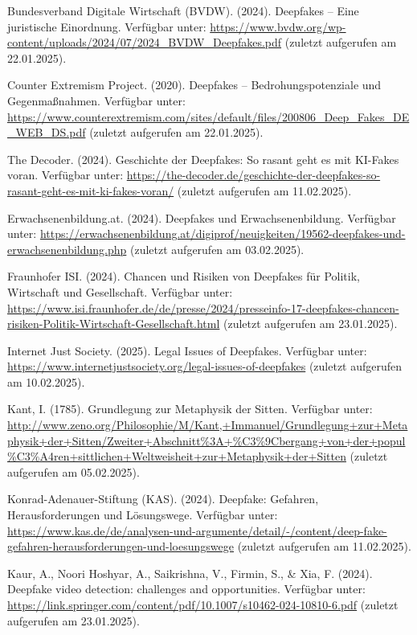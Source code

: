 \documentclass[a4paper,12pt]{article}
\begin{document}
\begin{thebibliography}{99}
 Bundesverband Digitale Wirtschaft (BVDW). (2024). Deepfakes – Eine juristische Einordnung. 
Verfügbar unter: \url{https://www.bvdw.org/wp-content/uploads/2024/07/2024_BVDW_Deepfakes.pdf} (zuletzt aufgerufen am 22.01.2025).

 Counter Extremism Project. (2020). Deepfakes – Bedrohungspotenziale und Gegenmaßnahmen.
Verfügbar unter: \url{https://www.counterextremism.com/sites/default/files/200806_Deep_Fakes_DE_WEB_DS.pdf} (zuletzt aufgerufen am 22.01.2025).

 The Decoder. (2024). Geschichte der Deepfakes: So rasant geht es mit KI-Fakes voran.
Verfügbar unter: \url{https://the-decoder.de/geschichte-der-deepfakes-so-rasant-geht-es-mit-ki-fakes-voran/} (zuletzt aufgerufen am 11.02.2025).

 Erwachsenenbildung.at. (2024). Deepfakes und Erwachsenenbildung. 
Verfügbar unter: \url{https://erwachsenenbildung.at/digiprof/neuigkeiten/19562-deepfakes-und-erwachsenenbildung.php} (zuletzt aufgerufen am 03.02.2025).

 Fraunhofer ISI. (2024). Chancen und Risiken von Deepfakes für Politik, Wirtschaft und Gesellschaft. 
Verfügbar unter: \url{https://www.isi.fraunhofer.de/de/presse/2024/presseinfo-17-deepfakes-chancen-risiken-Politik-Wirtschaft-Gesellschaft.html} (zuletzt aufgerufen am 23.01.2025).

 Internet Just Society. (2025). Legal Issues of Deepfakes.
Verfügbar unter: \url{https://www.internetjustsociety.org/legal-issues-of-deepfakes} (zuletzt aufgerufen am 10.02.2025).

 Kant, I. (1785). Grundlegung zur Metaphysik der Sitten.  
Verfügbar unter: \url{http://www.zeno.org/Philosophie/M/Kant,+Immanuel/Grundlegung+zur+Metaphysik+der+Sitten/Zweiter+Abschnitt%3A+%C3%9Cbergang+von+der+popul%C3%A4ren+sittlichen+Weltweisheit+zur+Metaphysik+der+Sitten} (zuletzt aufgerufen am 05.02.2025).

 Konrad-Adenauer-Stiftung (KAS). (2024). Deepfake: Gefahren, Herausforderungen und Lösungswege.
Verfügbar unter: \url{https://www.kas.de/de/analysen-und-argumente/detail/-/content/deep-fake-gefahren-herausforderungen-und-loesungswege} (zuletzt aufgerufen am 11.02.2025).

 Kaur, A., Noori Hoshyar, A., Saikrishna, V., Firmin, S., \& Xia, F. (2024). Deepfake video detection: challenges and opportunities. 
Verfügbar unter: \url{https://link.springer.com/content/pdf/10.1007/s10462-024-10810-6.pdf} (zuletzt aufgerufen am 23.01.2025).


\end{thebibliography}
\end{document}
